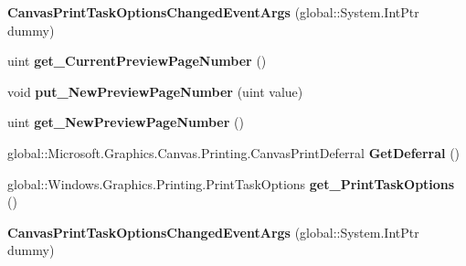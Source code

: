 \begin{DoxyCompactItemize}
{\bfseries Canvas\+Print\+Task\+Options\+Changed\+Event\+Args} (global\+::\+System.\+Int\+Ptr dummy)
\item 
\mbox{\label{class_microsoft_1_1_graphics_1_1_canvas_1_1_printing_1_1_canvas_print_task_options_changed_event_args_ae3f5890c727444a08d4a6459f5cfc573}} 
uint {\bfseries get\+\_\+\+Current\+Preview\+Page\+Number} ()
\item 
\mbox{\label{class_microsoft_1_1_graphics_1_1_canvas_1_1_printing_1_1_canvas_print_task_options_changed_event_args_ad00cc403b4ebc7392b88631a0ee7623a}} 
void {\bfseries put\+\_\+\+New\+Preview\+Page\+Number} (uint value)
\item 
\mbox{\label{class_microsoft_1_1_graphics_1_1_canvas_1_1_printing_1_1_canvas_print_task_options_changed_event_args_aece38cbf64c40df9549397a3a81d1a0d}} 
uint {\bfseries get\+\_\+\+New\+Preview\+Page\+Number} ()
\item 
\mbox{\label{class_microsoft_1_1_graphics_1_1_canvas_1_1_printing_1_1_canvas_print_task_options_changed_event_args_a405c22ab90187c1e5c88e7b0adb39dc3}} 
global\+::\+Microsoft.\+Graphics.\+Canvas.\+Printing.\+Canvas\+Print\+Deferral {\bfseries Get\+Deferral} ()
\item 
\mbox{\label{class_microsoft_1_1_graphics_1_1_canvas_1_1_printing_1_1_canvas_print_task_options_changed_event_args_a922bb94ae905cc5d2fe097942446c874}} 
global\+::\+Windows.\+Graphics.\+Printing.\+Print\+Task\+Options {\bfseries get\+\_\+\+Print\+Task\+Options} ()
\item 
\mbox{\label{class_microsoft_1_1_graphics_1_1_canvas_1_1_printing_1_1_canvas_print_task_options_changed_event_args_a44eba7f824a24c6918f5415a6ffa01a0}} 
{\bfseries Canvas\+Print\+Task\+Options\+Changed\+Event\+Args} (global\+::\+System.\+Int\+Ptr dummy)

\end{DoxyCompactItemize}
